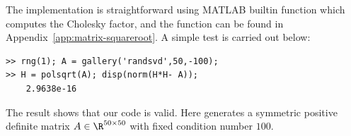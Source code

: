 \documentclass{article}
\numberwithin{equation}{section} %
\begin{document}
The implementation is straightforward using MATLAB builtin function
 which computes the Cholesky factor, and the function
 can be found in Appendix~\ref{app:matrix-squareroot}. A
simple test is carried out below:
\begin{lstlisting}[numbers=none]
>> rng(1); A = gallery('randsvd',50,-100);
>> H = polsqrt(A); disp(norm(H*H- A));
    2.9638e-16
\end{lstlisting}
The result shows that our code is valid. Here
 generates a symmetric positive definite
matrix $A\in\R^{50\times 50}$ with fixed condition number $100$.



\newpage


\end{document}
